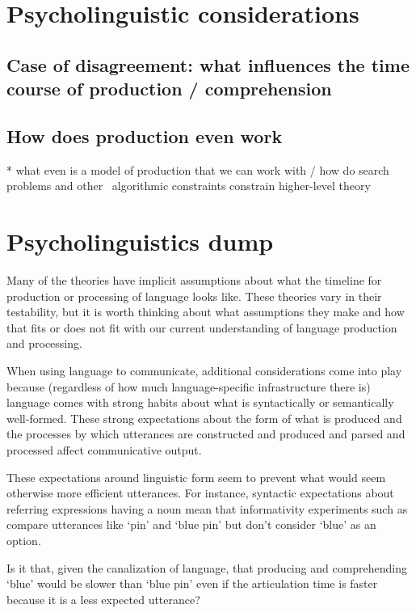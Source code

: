 \documentclass[]{article}
\begin{document}

\section{Psycholinguistic considerations}

\subsection{Case of disagreement: what influences the time course of production / comprehension }

\subsection{How does production even work}
* what even is a model of production that we can work with / how do search problems and other ~algorithmic constraints constrain higher-level theory


\section{Psycholinguistics dump}

Many of the theories have implicit assumptions about what the timeline for production or processing of language looks like. These theories vary in their testability, but it is worth thinking about what assumptions they make and how that fits or does not fit with our current understanding of language production and processing. 

When using language to communicate, additional considerations come into play because (regardless of how much language-specific infrastructure there is) language comes with strong habits about what is syntactically or semantically well-formed. These strong expectations about the form of what is produced and the processes by which utterances are constructed and produced and parsed and processed affect communicative output.

These expectations around linguistic form seem to prevent what would seem otherwise more efficient utterances. For instance, syntactic expectations about referring expressions having a noun mean that informativity experiments such as \cite{degen20200406} compare utterances like `pin' and `blue pin' but don't consider `blue' as an option. 

Is it that, given the canalization of language, that producing and comprehending `blue' would be slower than `blue pin' even if the articulation time is faster because it is a less expected utterance? 
\end{document}
